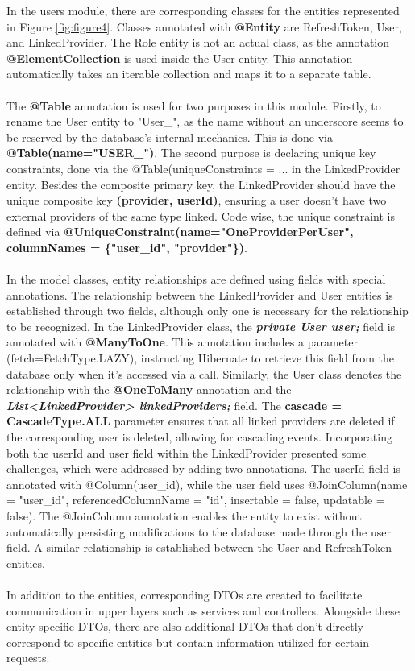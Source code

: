 \newpage
\noindent In the users module, there are corresponding classes for the entities represented in Figure \ref{fig:figure4}. Classes annotated with \textbf{@Entity} are RefreshToken, User, and LinkedProvider. The Role entity is not an actual class, as the annotation \textbf{@ElementCollection} is used inside the User entity. This annotation automatically takes an iterable collection and maps it to a separate table.
\\\\
The \textbf{@Table} annotation is used for two purposes in this module. Firstly, to rename the User entity to "User\_", as the name without an underscore seems to be reserved by the database's internal mechanics. This is done via \textbf{@Table(name="USER\_")}. The second purpose is declaring unique key constraints, done via the {@Table(uniqueConstraints = {...}} in the LinkedProvider entity. Besides the composite primary key, the LinkedProvider should have the unique composite key \textbf{(provider, userId)}, ensuring a user doesn't have two external providers of the same type linked. Code wise, the unique constraint is defined via \textbf{@UniqueConstraint(name="OneProviderPerUser", columnNames = \{"user\_id", "provider"\})}.
\\\\
\noindent In the model classes, entity relationships are defined using fields with special annotations. The relationship between the LinkedProvider and User entities is established through two fields, although only one is necessary for the relationship to be recognized. In the LinkedProvider class, the \textbf{\textit{private User user;}} field is annotated with \textbf{@ManyToOne}. This annotation includes a parameter (fetch=FetchType.LAZY), instructing Hibernate to retrieve this field from the database only when it's accessed via a call. Similarly, the User class denotes the relationship with the \textbf{@OneToMany} annotation and the \textbf{\textit{List<LinkedProvider> linkedProviders;}} field. The \textbf{cascade = CascadeType.ALL} parameter ensures that all linked providers are deleted if the corresponding user is deleted, allowing for cascading events. Incorporating both the userId and user field within the LinkedProvider presented some challenges, which were addressed by adding two annotations. The userId field is annotated with @Column(user\_id), while the user field uses @JoinColumn(name = "user\_id", referencedColumnName = "id", insertable = false, updatable = false). The @JoinColumn annotation enables the entity to exist without automatically persisting modifications to the database made through the user field. A similar relationship is established between the User and RefreshToken entities.
\\\\
\noindent In addition to the entities, corresponding DTOs are created to facilitate communication in upper layers such as services and controllers. Alongside these entity-specific DTOs, there are also additional DTOs that don't directly correspond to specific entities but contain information utilized for certain requests.

